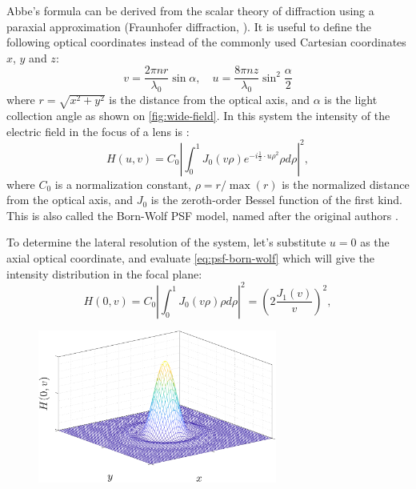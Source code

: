     Abbe's formula can be derived from the scalar theory of diffraction using a paraxial approximation (Fraunhofer diffraction, \cite{born_principles_2013}).
    It is useful to define the following optical coordinates instead of the commonly used Cartesian coordinates $x$, $y$ and $z$:
    \begin{equation}
      v = \frac{2\pi n  r}{\lambda_0} \sin \alpha, \quad
      u=\frac{8\pi n  z}{\lambda_0} \sin^2 \frac{\alpha}{2}
      \label{eq:substitutions}
    \end{equation}
    where $r = \sqrt{x^2 + y^2}$ is the distance from the optical axis, and $\alpha$ is the light collection angle as shown on \autoref{fig:wide-field}. In this system the intensity of the electric field in the focus of a lens is \cite{sheppard_imaging_1987}:
    \begin{equation}
      H(u,v) = C_0 \left| \int_0^1 J_0 (v\rho)e^{-i\frac{1}{2}\cdot u\rho^2} \rho d \rho \right|^2,
      \label{eq:psf-born-wolf}
    \end{equation}
    where $C_0$ is a normalization constant,  $\rho = r / \max(r)$ is the normalized distance from the optical axis, and $J_0$ is the zeroth-order Bessel function of the first kind. This is also called the Born-Wolf PSF model, named after the original authors \cite{born_principles_2013}.
    
    

    To determine the lateral resolution of the system, let's substitute $u=0$ as the axial optical coordinate, and evaluate \autoref{eq:psf-born-wolf} which will give the intensity distribution in the focal plane:
    \begin{equation}
      H(0,v) = C_0 \left| \int_0^1 J_0(v\rho)\rho d \rho \right|^2 = \left(2\frac{J_1(v)}{v} \right) ^2,
      \label{eq:airy}
    \end{equation}
    \begin{figure}
      \centering
      \includegraphics[width=0.7\textwidth]{airy}
      \label{fig:airy}
    \end{figure}


